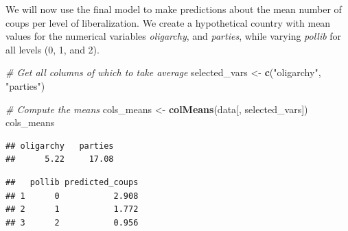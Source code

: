 \documentclass[
  11pt,
]{article}
\newenvironment{Shaded}{\begin{snugshade}}{\end{snugshade}}
\newcommand{\AttributeTok}[1]{\textcolor[rgb]{0.13,0.29,0.53}{#1}}
\newcommand{\CommentTok}[1]{\textcolor[rgb]{0.56,0.35,0.01}{\textit{#1}}}
\newcommand{\DecValTok}[1]{\textcolor[rgb]{0.00,0.00,0.81}{#1}}
\newcommand{\FunctionTok}[1]{\textcolor[rgb]{0.13,0.29,0.53}{\textbf{#1}}}
\newcommand{\NormalTok}[1]{#1}
\newcommand{\OtherTok}[1]{\textcolor[rgb]{0.56,0.35,0.01}{#1}}
\newcommand{\SpecialCharTok}[1]{\textcolor[rgb]{0.81,0.36,0.00}{\textbf{#1}}}
\newcommand{\StringTok}[1]{\textcolor[rgb]{0.31,0.60,0.02}{#1}}
\begin{document}
We will now use the final model to make predictions about the mean
number of coups per level of liberalization. We create a hypothetical
country with mean values for the numerical variables \emph{oligarchy},
and \emph{parties}, while varying \emph{pollib} for all levels (0, 1,
and 2).

\begin{Shaded}
\begin{Highlighting}[]
\CommentTok{\# Get all columns of which to take average}
\NormalTok{selected\_vars }\OtherTok{\textless{}{-}} \FunctionTok{c}\NormalTok{(}\StringTok{"oligarchy"}\NormalTok{, }\StringTok{"parties"}\NormalTok{) }

\CommentTok{\# Compute the means}
\NormalTok{cols\_means }\OtherTok{\textless{}{-}} \FunctionTok{colMeans}\NormalTok{(data[, selected\_vars])}
\NormalTok{cols\_means}
\end{Highlighting}
\end{Shaded}

\begin{verbatim}
## oligarchy   parties 
##      5.22     17.08
\end{verbatim}

\begin{Shaded}
\end{Shaded}

\begin{verbatim}
##   pollib predicted_coups
## 1      0           2.908
## 2      1           1.772
## 3      2           0.956
\end{verbatim}
\end{document}
